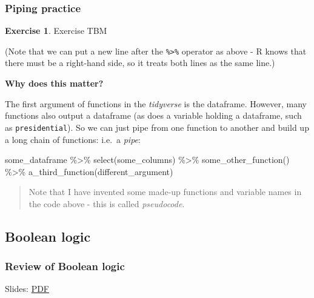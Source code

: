 \documentclass[
]{article}
\newenvironment{Shaded}{\begin{snugshade}}{\end{snugshade}}
\newcommand{\FunctionTok}[1]{\textcolor[rgb]{0.00,0.00,0.00}{#1}}
\newcommand{\NormalTok}[1]{#1}
\newcommand{\SpecialCharTok}[1]{\textcolor[rgb]{0.00,0.00,0.00}{#1}}
\theoremstyle{definition}
\theoremstyle{definition}
\theoremstyle{definition}
\newtheorem{exercise}{Exercise}[section]
\theoremstyle{definition}
\theoremstyle{remark}
\begin{document}
\hypertarget{piping-practice}{%
\subsubsection{Piping practice}\label{piping-practice}}

\begin{exercise}
Exercise TBM
\end{exercise}

(Note that we can put a new line after the \texttt{\%\textgreater{}\%} operator as above - R knows that there must be a right-hand side, so it treats both lines as the same line.)

\textbf{Why does this matter?}

The first argument of functions in the \emph{tidyverse} is the dataframe. However, many functions also output a dataframe (as does a variable holding a dataframe, such as \texttt{presidential}). So we can just pipe from one function to another and build up a long chain of functions: i.e.~a \emph{pipe}:

\begin{Shaded}
\begin{Highlighting}[]
\NormalTok{some\_dataframe }\SpecialCharTok{\%\textgreater{}\%}
  \FunctionTok{select}\NormalTok{(some\_columns) }\SpecialCharTok{\%\textgreater{}\%}
  \FunctionTok{some\_other\_function}\NormalTok{() }\SpecialCharTok{\%\textgreater{}\%}
  \FunctionTok{a\_third\_function}\NormalTok{(different\_argument)}
\end{Highlighting}
\end{Shaded}

\begin{quote}
Note that I have invented some made-up functions and variable names in the code above - this is called \emph{pseudocode}.
\end{quote}

\hypertarget{boolean-logic}{%
\subsection{Boolean logic}\label{boolean-logic}}

\hypertarget{review-of-boolean-logic}{%
\subsubsection{Review of Boolean logic}\label{review-of-boolean-logic}}

Slides: \href{https://drive.google.com/file/d/1j8y2iLJSiiH7B-NmA6T-Qf9-Mlyb3m1x}{PDF}
\end{document}

